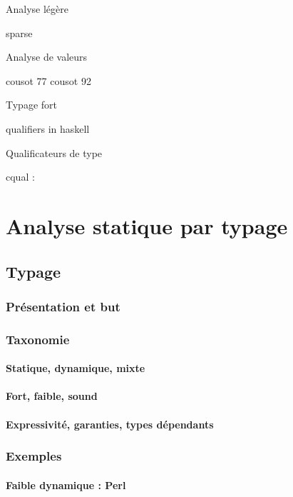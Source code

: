 \documentclass{phdthesis}
\begin{document}
Analyse légère

  sparse
  \cite{TorvaldsSparse}

Analyse de valeurs

cousot 77 \cite{Cousot77}
cousot 92 \cite{Cousot92-1}

Typage fort

  qualifiers in haskell
  \cite{lightweight-static-capabilities}
  \cite{LZ06a}

Qualificateurs de type

  cqual :
  \cite{pldi99}
  \cite{usenix01}
  \cite{pldi02}
  \cite{cquk-usenix04}
  \cite{toplas-quals}

\part{Analyse statique par typage}

\chapter{Typage}

\section{Présentation et but}
\section{Taxonomie}

\subsection{Statique, dynamique, mixte}
\subsection{Fort, faible, sound}
\subsection{Expressivité, garanties, types dépendants}

\section{Exemples}

\subsection{Faible dynamique : Perl}
\end{document}

